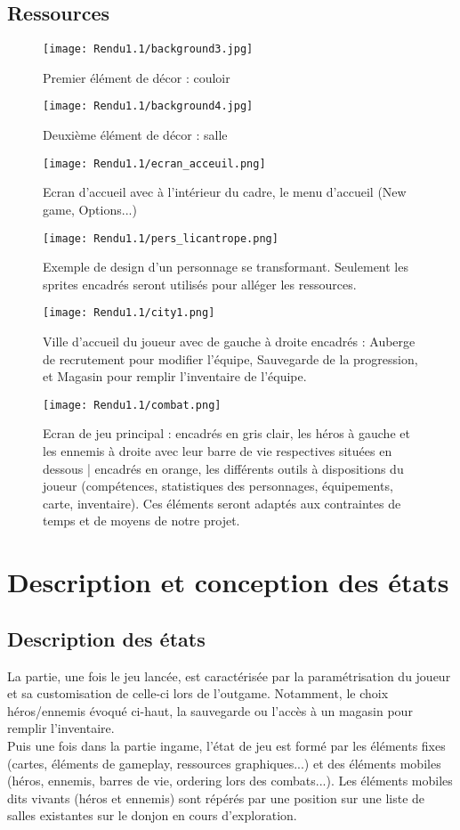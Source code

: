 \documentclass[a4paper,12pt]{article}
\begin{document}
\subsection{Ressources}
\begin{figure}[!ht]
  \centering
  \texttt{[image: Rendu1.1/background3.jpg]}
  \caption{Premier élément de décor : couloir}
\end{figure}
\begin{figure}[!ht]
  \centering
  \texttt{[image: Rendu1.1/background4.jpg]}
  \caption{Deuxième élément de décor : salle}
\end{figure}
\begin{figure}[!ht]
  \centering
  \texttt{[image: Rendu1.1/ecran\_acceuil.png]}
  \caption{Ecran d'accueil avec à l'intérieur du cadre, le menu d'accueil (New game, Options...)}
\end{figure}
\begin{figure}[!ht]
  \centering
  \texttt{[image: Rendu1.1/pers\_licantrope.png]}
  \caption{Exemple de design d'un personnage se transformant. Seulement les sprites encadrés seront utilisés pour alléger les ressources.}
\end{figure}
\begin{figure}[!ht]
  \centering
  \texttt{[image: Rendu1.1/city1.png]}
  \caption{Ville d'accueil du joueur avec de gauche à droite encadrés :  Auberge de recrutement pour modifier l'équipe, Sauvegarde de la progression, et Magasin pour remplir l'inventaire de l'équipe.}
\end{figure}
\begin{figure}[!ht]
  \centering
  \texttt{[image: Rendu1.1/combat.png]}
  \caption{Ecran de jeu principal : encadrés en gris clair, les héros à gauche et les ennemis à droite avec leur barre de vie respectives situées en dessous | encadrés en orange, les différents outils à dispositions du joueur (compétences, statistiques des personnages, équipements, carte, inventaire). Ces éléments seront adaptés aux contraintes de temps et de moyens de notre projet.}
\end{figure}
\clearpage
\newpage
\section{Description et conception des états}
\subsection{Description des états}
La partie, une fois le jeu lancée, est caractérisée par la paramétrisation du joueur et sa customisation de celle-ci lors de l'outgame. Notamment, le choix héros/ennemis évoqué ci-haut, la sauvegarde ou l'accès à un magasin pour remplir l'inventaire. 
\\ \indent
Puis une fois dans la partie ingame, l'état de jeu est formé par les éléments fixes (cartes, éléments de gameplay, ressources graphiques...) et des éléments mobiles (héros, ennemis, barres de vie, ordering lors des combats...). Les éléments mobiles dits vivants (héros et ennemis) sont répérés par une position sur une liste de salles existantes sur le donjon en cours d'exploration. 
\end{document}

